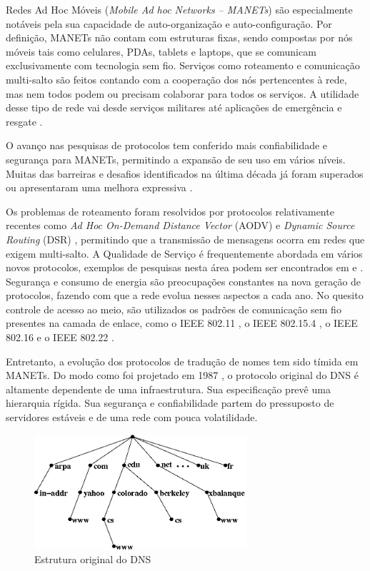 \label{intro}

Redes Ad Hoc Móveis (\textit{Mobile Ad hoc Networks -- MANETs}) são especialmente notáveis pela sua capacidade
de auto-organização e auto-configuração. Por definição, MANETs não contam com
estruturas fixas, sendo compostas por nós móveis tais como celulares, PDAs,
tablets e laptops, que se comunicam exclusivamente com tecnologia sem fio. Serviços
como roteamento e comunicação multi-salto são feitos contando com a cooperação
dos nós pertencentes à rede, mas nem todos podem ou precisam colaborar para todos
os serviços. A utilidade desse tipo de rede vai desde serviços militares até aplicações
de emergência e resgate \cite{manet-def}.

O avanço nas pesquisas de protocolos tem conferido mais confiabilidade e segurança
para MANETs, permitindo a expansão de seu uso em vários níveis. Muitas das
barreiras e desafios identificados na última década já foram superados ou apresentaram
uma melhora expressiva \cite{manet-state}.

Os problemas de roteamento foram resolvidos por protocolos relativamente recentes
como \textit{Ad Hoc On-Demand Distance Vector} (AODV) \cite{aodv} e
\textit{Dynamic Source Routing} (DSR) \cite{dsr}, permitindo que a transmissão de
mensagens ocorra em redes que exigem multi-salto. A Qualidade de Serviço é
frequentemente abordada em vários novos protocolos, exemplos de pesquisas nesta
área podem ser encontrados em \cite{qos1} e \cite{qos2}. Segurança e consumo de
energia são preocupações constantes na nova geração de protocolos, fazendo com
que a rede evolua nesses aspectos a cada ano. No quesito controle de acesso ao
meio, são utilizados os padrões de comunicação sem fio presentes na camada de enlace,
como o IEEE 802.11 \cite{802-11}, o IEEE 802.15.4 \cite{802-15}, o IEEE 802.16
\cite{802-16} e o IEEE 802.22 \cite{802-22}.

Entretanto, a evolução dos protocolos de tradução de nomes tem sido tímida em MANETs. Do
modo como foi projetado em 1987 \cite{rfc1035}, o protocolo original do DNS é
altamente dependente de uma infraestrutura. Sua especificação prevê uma hierarquia rígida.
Sua segurança e confiabilidade partem do pressuposto de servidores estáveis e de
uma rede com pouca volatilidade.

\begin{figure}[h!]
    \centering
    \includegraphics[width=0.7\textwidth]{figures/dns-1}
    \caption{Estrutura original do DNS}
    \label{dns}
\end{figure}

